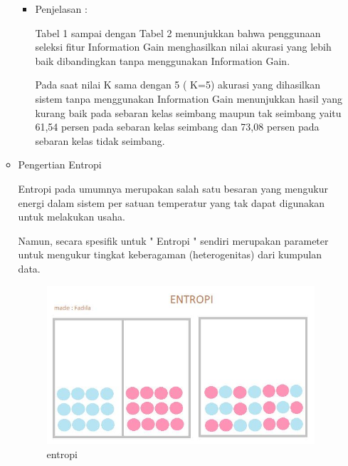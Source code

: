 \begin{enumerate}
\begin{itemize}
\begin{itemize}
\item Penjelasan :
\par Tabel 1 sampai dengan Tabel 2 menunjukkan bahwa penggunaan seleksi fitur Information Gain menghasilkan nilai akurasi yang lebih baik dibandingkan tanpa menggunakan Information Gain. 
\par Pada saat nilai K sama dengan 5 ( K=5) akurasi yang dihasilkan sistem tanpa menggunakan Information Gain menunjukkan hasil yang kurang baik pada sebaran kelas seimbang maupun tak seimbang yaitu 61,54 persen pada sebaran kelas seimbang dan 73,08 persen pada sebaran kelas tidak seimbang. 
\end{itemize}


\par
\item Pengertian Entropi
\par Entropi pada umumnya merupakan salah satu besaran yang mengukur energi dalam sistem per satuan temperatur yang tak dapat digunakan untuk melakukan usaha.
\par Namun, secara spesifik untuk " Entropi " sendiri merupakan parameter untuk mengukur tingkat keberagaman (heterogenitas) dari kumpulan data. 

\par

\begin{figure}[ht]
\centering
\includegraphics[scale=0.5]{figures/entropi.jpg}
\caption{entropi}
\label{contoh}
\end{figure}

\par
\end{itemize}


\end{enumerate}
